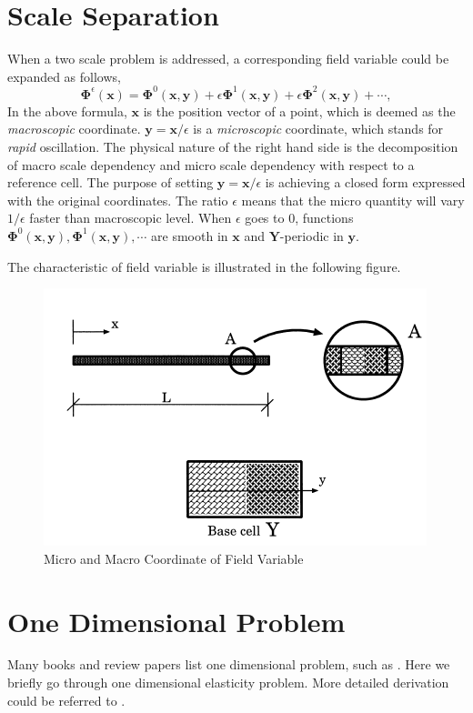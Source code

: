 \section{Scale Separation}
When a two scale problem is addressed, a corresponding field variable could be expanded as follows, 
%
\begin{equation}
\label{eq:field epsi}
\mathbf{\Phi}^{\epsilon}(\mathbf{x}) = \mathbf{\Phi}^{0}(\mathbf{x},\mathbf{y}) + \epsilon\mathbf{\Phi}^{1}(\mathbf{x},\mathbf{y}) + \epsilon\mathbf{\Phi}^{2}(\mathbf{x},\mathbf{y}) + \cdots,
\end{equation}
%
In the above formula, $\mathbf{x}$ is the position vector of a point, which is deemed as the \textit{macroscopic} coordinate. $\mathbf{y}=\mathbf{x}/\epsilon$ is a \textit{microscopic} coordinate, which stands for \textit{rapid} oscillation. The physical nature of the right hand side is the decomposition of macro scale dependency and micro scale dependency with respect to a reference cell. The purpose of setting $\mathbf{y}=\mathbf{x}/\epsilon$ is achieving a closed form expressed with the original coordinates. The ratio $\epsilon$ means that the micro quantity will vary $1/\epsilon$ faster than macroscopic level. When $\epsilon$ goes to $0$, functions $\mathbf{\Phi}^{0}(\mathbf{x}, \mathbf{y}), \mathbf{\Phi}^{1}(\mathbf{x}, \mathbf{y}), \cdots$ are smooth in $\mathbf{x}$ and $\mathbf{Y}$-periodic in $\mathbf{y}$.

The characteristic of field variable is illustrated in the following figure.

\begin{figure}[h]
  \centering
    \label{fig: scale sepa}
    \includegraphics[width=0.45\linewidth]{../pics/ref_cell_mic_mac_coord.png}
  \caption{Micro and Macro Coordinate of Field Variable \citep{hassani1998review}}
\end{figure}

\section{One Dimensional Problem}
Many books and review papers list one dimensional problem, such as \citep{cioranescu2000introduction}. Here we briefly go through one dimensional elasticity problem. More detailed derivation could be referred to \citep{hassani1998review}.

